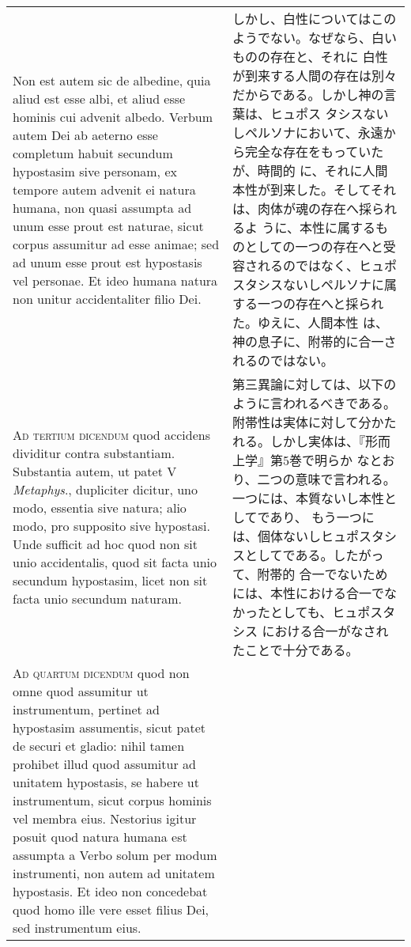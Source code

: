 \documentclass[10pt]{jsarticle} %
\begin{document}
\begin{longtable}{p{21em}p{21em}}
\\


Non est autem sic de albedine,
quia aliud est esse albi, et aliud esse hominis cui advenit
albedo. Verbum autem Dei ab aeterno esse completum habuit secundum
hypostasim sive personam, ex tempore autem advenit ei natura humana, non
quasi assumpta ad unum esse prout est naturae, sicut corpus assumitur ad
esse animae; sed ad unum esse prout est hypostasis vel personae. Et ideo
humana natura non unitur accidentaliter filio Dei.

&

しかし、白性についてはこのようでない。なぜなら、白いものの存在と、それに
 白性が到来する人間の存在は別々だからである。しかし神の言葉は、ヒュポス
 タシスないしペルソナにおいて、永遠から完全な存在をもっていたが、時間的
 に、それに人間本性が到来した。そしてそれは、肉体が魂の存在へ採られるよ
 うに、本性に属するものとしての一つの存在へと受容されるのではなく、ヒュポ
 スタシスないしペルソナに属する一つの存在へと採られた。ゆえに、人間本性
 は、神の息子に、附帯的に合一されるのではない。


\\



{\scshape Ad tertium dicendum} quod accidens dividitur contra
substantiam. Substantia autem, ut patet V {\itshape Metaphys}., dupliciter dicitur,
uno modo, essentia sive natura; alio modo, pro supposito sive
hypostasi. Unde sufficit ad hoc quod non sit unio accidentalis, quod sit
facta unio secundum hypostasim, licet non sit facta unio secundum
naturam.

&

第三異論に対しては、以下のように言われるべきである。
附帯性は実体に対して分かたれる。しかし実体は、『形而上学』第5巻で明らか
 なとおり、二つの意味で言われる。一つには、本質ないし本性としてであり、
 もう一つには、個体ないしヒュポスタシスとしてである。したがって、附帯的
 合一でないためには、本性における合一でなかったとしても、ヒュポスタシス
 における合一がなされたことで十分である。


\\



{\scshape Ad quartum dicendum} quod non omne quod assumitur ut instrumentum,
pertinet ad hypostasim assumentis, sicut patet de securi et gladio: nihil
tamen prohibet illud quod assumitur ad unitatem hypostasis, se habere ut
instrumentum, sicut corpus hominis vel membra eius. Nestorius igitur
posuit quod natura humana est assumpta a Verbo solum per modum
instrumenti, non autem ad unitatem hypostasis. 
Et ideo non concedebat
quod homo ille vere esset filius Dei, sed instrumentum eius.


\end{longtable}
\end{document}
